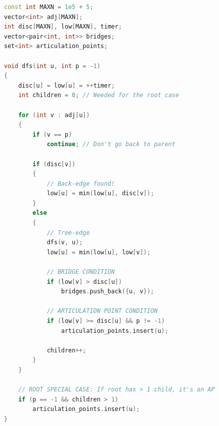 \documentclass[10pt,landscape,a4paper,twocolumn]{article}
\begin{document}
\begin{lstlisting}[language=C++]
const int MAXN = 1e5 + 5;
vector<int> adj[MAXN];
int disc[MAXN], low[MAXN], timer;
vector<pair<int, int>> bridges;
set<int> articulation_points;

void dfs(int u, int p = -1)
{
    disc[u] = low[u] = ++timer;
    int children = 0; // Needed for the root case

    for (int v : adj[u])
    {
        if (v == p)
            continue; // Don't go back to parent

        if (disc[v])
        {
            // Back-edge found!
            low[u] = min(low[u], disc[v]);
        }
        else
        {
            // Tree-edge
            dfs(v, u);
            low[u] = min(low[u], low[v]);

            // BRIDGE CONDITION
            if (low[v] > disc[u])
                bridges.push_back({u, v});

            // ARTICULATION POINT CONDITION
            if (low[v] >= disc[u] && p != -1)
                articulation_points.insert(u);

            children++;
        }
    }

    // ROOT SPECIAL CASE: If root has > 1 child, it's an AP
    if (p == -1 && children > 1)
        articulation_points.insert(u);
}

\end{lstlisting}
\end{document}
